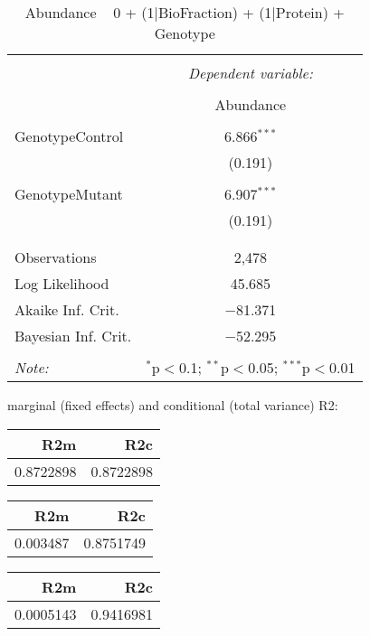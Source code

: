 \documentclass[11pt]{report}
\begin{document}
\begin{table}[!htbp] \centering 
  \caption{Abundance ~ 0 + (1|BioFraction) + (1|Protein) + Genotype} 
  \label{} 
\begin{tabular}{@{\extracolsep{5pt}}lc} 
\\[-1.8ex]\hline 
\hline \\[-1.8ex] 
 & \multicolumn{1}{c}{\textit{Dependent variable:}} \\ 
\cline{2-2} 
\\[-1.8ex] & Abundance \\ 
\hline \\[-1.8ex] 
 GenotypeControl & 6.866$^{***}$ \\ 
  & (0.191) \\ 
  & \\ 
 GenotypeMutant & 6.907$^{***}$ \\ 
  & (0.191) \\ 
  & \\ 
\hline \\[-1.8ex] 
Observations & 2,478 \\ 
Log Likelihood & 45.685 \\ 
Akaike Inf. Crit. & $-$81.371 \\ 
Bayesian Inf. Crit. & $-$52.295 \\ 
\hline 
\hline \\[-1.8ex] 
\textit{Note:}  & \multicolumn{1}{r}{$^{*}$p$<$0.1; $^{**}$p$<$0.05; $^{***}$p$<$0.01} \\ 
\end{tabular} 
\end{table} 
marginal (fixed effects) and conditional (total variance) R2:

\begin{tabular}{r|r}
\hline
R2m & R2c\\
\hline
0.8722898 & 0.8722898\\
\hline
\end{tabular}

\begin{tabular}{r|r}
\hline
R2m & R2c\\
\hline
0.003487 & 0.8751749\\
\hline
\end{tabular}

\begin{tabular}{r|r}
\hline
R2m & R2c\\
\hline
0.0005143 & 0.9416981\\
\hline
\end{tabular}
\end{document}
